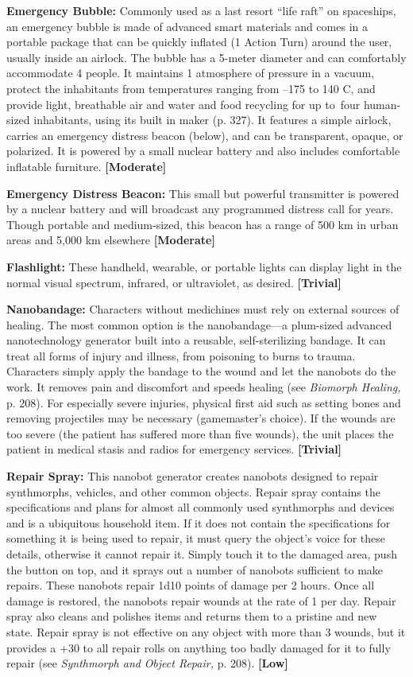 \textbf{Emergency Bubble:} Commonly
used as a last resort
``life raft'' on spaceships, 
an emergency bubble is 
made of advanced smart 
materials and comes in 
a portable package that 
can be quickly inflated 
(1 Action Turn) around 
the user, usually inside an 
airlock. The bubble has a 
5-meter diameter and can 
comfortably accommodate 
4 people. It maintains 1 atmosphere
of pressure in a vacuum, protect the inhabitants
from temperatures ranging from –175 to 140 C,
and provide light, breathable air and water and food 
recycling for up to four human-sized inhabitants, using 
its built in maker (p. 327). It features a simple airlock, 
carries an emergency distress beacon (below), and can 
be transparent, opaque, or polarized. It is powered by 
a small nuclear battery and also includes comfortable 
inflatable furniture. \textbf{[Moderate]}

\textbf{Emergency Distress Beacon:} This small but powerful
transmitter is powered by a nuclear battery and
will broadcast any programmed distress call for years. 
Though portable and medium-sized, this beacon has 
a range of 500 km in urban areas and 5,000 km elsewhere
\textbf{[Moderate]}

\textbf{Flashlight:} These handheld, wearable, or portable 
lights can display light in the normal visual spectrum, 
infrared, or ultraviolet, as desired. \textbf{[Trivial]}

\textbf{Nanobandage: }Characters without medichines must 
rely on external sources of healing. The most common 
option is the nanobandage—a plum-sized advanced 
nanotechnology generator built into a reusable, self-sterilizing
bandage. It can treat all forms of injury and
illness, from poisoning to burns to trauma. Characters 
simply apply the bandage to the wound and let the 
nanobots do the work. It removes pain and discomfort
and speeds healing (see \textit{Biomorph Healing,} p.
208). For especially severe injuries, physical first aid 
such as setting bones and removing projectiles may 
be necessary (gamemaster's choice). If the wounds are 
too severe (the patient has suffered more than five 
wounds), the unit places the patient in medical stasis 
and radios for emergency services. \textbf{[Trivial]}

\textbf{Repair Spray: }This nanobot generator creates 
nanobots designed to repair synthmorphs, vehicles, 
and other common objects. Repair spray contains 
the specifications and plans for almost all commonly 
used synthmorphs and devices and is a ubiquitous 
household item. If it does not contain the specifications
for something it is being used to repair, it must
query the object's voice for these details, otherwise 
it cannot repair it. Simply touch it to the damaged 
area, push the button on top, and it sprays out a 
number of nanobots sufficient to make repairs. 
These nanobots repair 1d10 points of damage per 
2 hours. Once all damage is restored, the nanobots 
repair wounds at the rate of 1 per day. Repair spray 
also cleans and polishes items and returns them to a 
pristine and new state. Repair spray is not effective 
on any object with more than 3 wounds, but it provides
a +30 to all repair rolls on anything too badly
damaged for it to fully repair (see \textit{Synthmorph and }
\textit{Object Repair,} p. 208). \textbf{[Low]}

